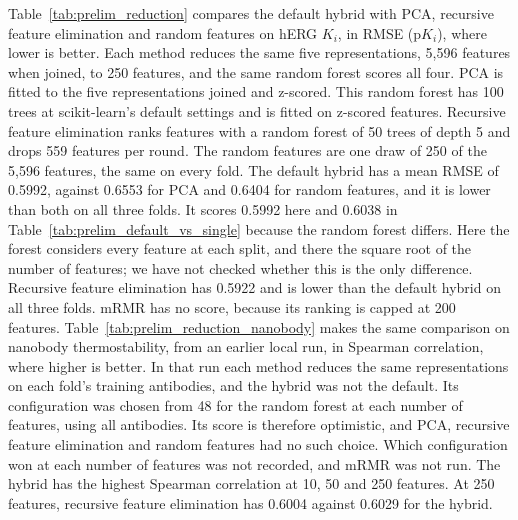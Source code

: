 
Table~\ref{tab:prelim_reduction} compares the default hybrid with PCA, recursive feature elimination and random features on hERG $K_i$, in RMSE (p$K_i$), where lower is better. Each method reduces the same five representations, 5,596 features when joined, to 250 features, and the same random forest scores all four. PCA is fitted to the five representations joined and z-scored. This random forest has 100 trees at scikit-learn's default settings and is fitted on z-scored features. Recursive feature elimination ranks features with a random forest of 50 trees of depth 5 and drops 559 features per round. The random features are one draw of 250 of the 5,596 features, the same on every fold. The default hybrid has a mean RMSE of 0.5992, against 0.6553 for PCA and 0.6404 for random features, and it is lower than both on all three folds. It scores 0.5992 here and 0.6038 in Table~\ref{tab:prelim_default_vs_single} because the random forest differs. Here the forest considers every feature at each split, and there the square root of the number of features; we have not checked whether this is the only difference. Recursive feature elimination has 0.5922 and is lower than the default hybrid on all three folds. mRMR has no score, because its ranking is capped at 200 features. Table~\ref{tab:prelim_reduction_nanobody} makes the same comparison on nanobody thermostability, from an earlier local run, in Spearman correlation, where higher is better. In that run each method reduces the same representations on each fold's training antibodies, and the hybrid was not the default. Its configuration was chosen from 48 for the random forest at each number of features, using all antibodies. Its score is therefore optimistic, and PCA, recursive feature elimination and random features had no such choice. Which configuration won at each number of features was not recorded, and mRMR was not run. The hybrid has the highest Spearman correlation at 10, 50 and 250 features. At 250 features, recursive feature elimination has 0.6004 against 0.6029 for the hybrid.

